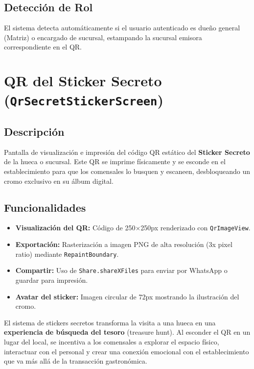 \documentclass[11pt, a4paper, oneside]{report}
\begin{document}
\subsection{Detección de Rol}
El sistema detecta automáticamente si el usuario autenticado es dueño general (Matriz) o encargado de sucursal, estampando la sucursal emisora correspondiente en el QR.

\section{QR del Sticker Secreto (\texttt{QrSecretStickerScreen})}

\subsection{Descripción}
Pantalla de visualización e impresión del código QR estático del \textbf{Sticker Secreto} de la hueca o sucursal. Este QR se imprime físicamente y se esconde en el establecimiento para que los comensales lo busquen y escaneen, desbloqueando un cromo exclusivo en su álbum digital.

\subsection{Funcionalidades}
\begin{itemize}
  \item \textbf{Visualización del QR:} Código de 250$\times$250px renderizado con \texttt{QrImageView}.
  \item \textbf{Exportación:} Rasterización a imagen PNG de alta resolución (3x pixel ratio) mediante \texttt{RepaintBoundary}.
  \item \textbf{Compartir:} Uso de \texttt{Share.shareXFiles} para enviar por WhatsApp o guardar para impresión.
  \item \textbf{Avatar del sticker:} Imagen circular de 72px mostrando la ilustración del cromo.
\end{itemize}

\begin{decisionbox}
El sistema de stickers secretos transforma la visita a una hueca en una \textbf{experiencia de búsqueda del tesoro} (treasure hunt). Al esconder el QR en un lugar del local, se incentiva a los comensales a explorar el espacio físico, interactuar con el personal y crear una conexión emocional con el establecimiento que va más allá de la transacción gastronómica.
\end{decisionbox}
\end{document}
